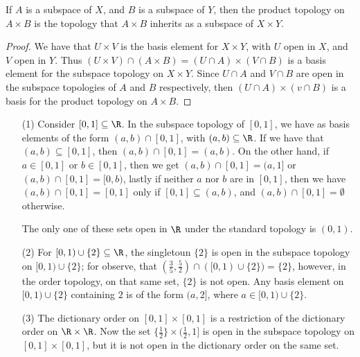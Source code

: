 \begin{theorem}\label{1.5.4}
    If $A$ is a subspace of  $X$, and  $B$ is a subspace of  $Y$, then the product topology on
     $A \times B$ is the topology that  $A \times B$ inherits as a subspace of  $X \times Y$.
\end{theorem}
\begin{proof}
    We have that $U \times V$ is the basis element for $X \times Y$, with  $U$ open in  $X$, and
    $V$ open in  $Y$. Thus  $(U \times V) \cap (A \times B)=(U \cap A) \times (V \cap B)$ is a basis element
    for the subspace topology on $X \times Y$. Since  $U \cap A$ and  $V \cap B$ are open in the subspace
    topologies of  $A$ and  $B$ respectively, then  $(U  \cap A) \times (v \cap B)$ is a basis for
    the product topology on $A \times B$.
\end{proof}

\begin{example}
    \begin{enumerate}
        \item[(1)] Consider $[0,1] \subseteq \R$. In the subspace topology of  $[0,1]$, we have as
            basis elements of the form $(a,b) \cap [0,1]$, with $(a,b) \subseteq \R$. If we have
            that  $(a,b) \subseteq [0,1]$, then $(a,b) \cap [0,1]=(a,b)$. On the other hand, if $a \in [0,1]$
            or $b \in [0,1]$, then we get $(a,b) \cap [0,1]=(a,1]$ or $(a,b) \cap [0,1]=[0,b)$, lastly if neither
            $a$ nor  $b$ are in $[0,1]$, then we have $(a,b) \cap [0,1]=[0,1]$ only if  $[0,1] \subseteq (a,b)$, and
            $(a,b) \cap [0,1]=\emptyset$ otherwise.

            The only one of these sets open in $\R$ under the standard topology
            is $(0,1)$.

        \item[(2)] For  $[0,1) \cup \{2\} \subseteq \R$, the singletoun  $\{2\}$ is open in the
            subspace topology on $[0,1) \cup \{2\}$; for observe, that $(\frac{3}{5},\frac{5}{2}) \cap
            ([0,1) \cup \{2\})=\{2\}$, however, in the order topology, on that same set, $\{2\}$ is not open.
            Any basis element on  $[0,1) \cup \{2\}$ containing  $2$ is of the form $(a,2]$, where
            $a \in [0,1) \cup \{2\}$.

        \item[(3)] The dictionary order on $[0,1] \times [0,1]$ is a restriction of the dictionary order
            on $\R \times \R$. Now the set  $\{\frac{1}{2}\} \times (\frac{1}{2},1]$ is open in the
            subspace topology on $[0,1] \times [0,1]$, but it is not open in the dictionary order on the
            same set.
    \end{enumerate}
\end{example}

